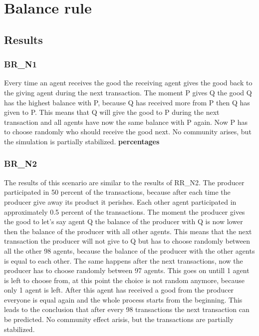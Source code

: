 \documentclass[twoside,openright]{uva-bachelor-thesis}
\begin{document}
\section{Balance rule}

\subsection{Results}

\subsubsection{BR\_N1}
Every time an agent receives the good the receiving agent gives the good back to the giving agent during the next transaction. The moment P gives Q the good Q has the highest balance with P, because Q has received more from P then Q has given to P. This means that Q will give the good to P during the next transaction and all agents have now the same balance with P again. Now P has to choose randomly who should receive the good next. No community arises, but the simulation is partially stabilized. \textbf{percentages}

\subsubsection{BR\_N2}
The results of this scenario are similar to the results of RR\_N2. The producer participated in 50 percent of the transactions, because after each time the producer give away its product it perishes. Each other agent participated in approximately 0.5 percent of the transactions. The moment the producer gives the good to let's say agent Q the balance of the producer with Q is now lower then the balance of the producer with all other agents. This means that the next transaction the producer will not give to Q but has to choose randomly between all the other 98 agents, because the balance of the producer with the other agents is equal to each other. The same happens after the next transactions, now the producer has to choose randomly between 97 agents. This goes on untill 1 agent is left to choose from, at this point the choice is not random anymore, because only 1 agent is left. After this agent has received a good from the producer everyone is equal again and the whole process starts from the beginning. This leads to the conclusion that after every 98 transactions the next transaction can be predicted.  No community effect arisis, but the transactions are partially stabilized.
\end{document}
